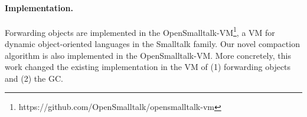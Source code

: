 \documentclass[sigplan,10pt,screen]{acmart}\settopmatter{printfolios=true,printccs=true,printacmref=true}
\def\OpenSmalltalkVM{OpenSmalltalk-VM\xspace}
\begin{document}


\paragraph{Implementation.} Forwarding objects are implemented in the \OpenSmalltalkVM\footnote{https://github.com/OpenSmalltalk/opensmalltalk-vm}, a VM for dynamic object-oriented languages in the Smalltalk family.
Our novel compaction algorithm is also implemented in the \OpenSmalltalkVM. 
More concretely, this work changed the existing implementation in the VM of (1) forwarding objects and (2) the GC. 
\end{document}
